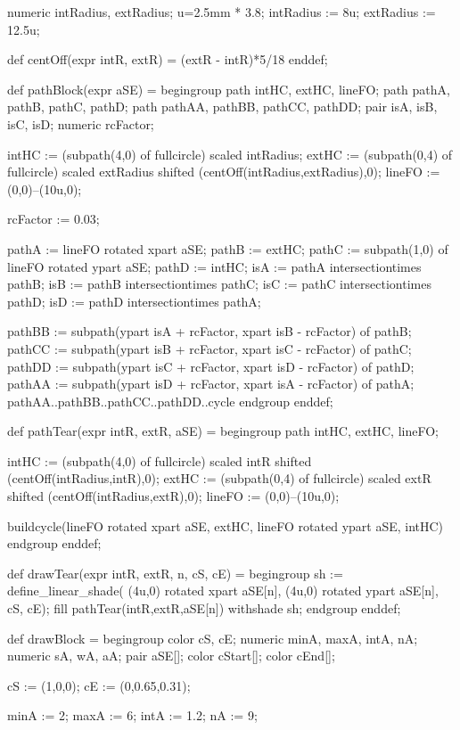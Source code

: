 numeric intRadius, extRadius;
u=2.5mm * 3.8;
intRadius := 8u;
extRadius := 12.5u;

def centOff(expr intR, extR) =
(extR - intR)*5/18
enddef;

def pathBlock(expr aSE) =
begingroup
path intHC, extHC, lineFO;
path pathA, pathB, pathC, pathD;
path pathAA, pathBB, pathCC, pathDD;
pair isA, isB, isC, isD;
numeric rcFactor; %

intHC := (subpath(4,0) of fullcircle) scaled intRadius;
extHC := (subpath(0,4) of fullcircle) scaled extRadius shifted (centOff(intRadius,extRadius),0);
lineFO := (0,0)--(10u,0);

rcFactor := 0.03;

pathA := lineFO rotated xpart aSE;
pathB := extHC;
pathC := subpath(1,0) of lineFO rotated ypart aSE;
pathD := intHC;
isA := pathA intersectiontimes pathB;
isB := pathB intersectiontimes pathC;
isC := pathC intersectiontimes pathD;
isD := pathD intersectiontimes pathA;

pathBB := subpath(ypart isA + rcFactor, xpart isB - rcFactor) of pathB;
pathCC := subpath(ypart isB + rcFactor, xpart isC - rcFactor) of pathC;
pathDD := subpath(ypart isC + rcFactor, xpart isD - rcFactor) of pathD;
pathAA := subpath(ypart isD + rcFactor, xpart isA - rcFactor) of pathA;
pathAA..pathBB..pathCC..pathDD..cycle
endgroup
enddef;

def pathTear(expr intR, extR, aSE) =
begingroup
path intHC, extHC, lineFO;

intHC := (subpath(4,0) of fullcircle) scaled intR shifted (centOff(intRadius,intR),0);
extHC := (subpath(0,4) of fullcircle) scaled extR shifted (centOff(intRadius,extR),0);
lineFO := (0,0)--(10u,0);

buildcycle(lineFO rotated xpart aSE, extHC, lineFO rotated ypart aSE, intHC)
endgroup
enddef;

def drawTear(expr intR, extR, n, cS, cE) =
begingroup
	sh := define_linear_shade(
			(4u,0) rotated xpart aSE[n],
			(4u,0) rotated ypart aSE[n],
			cS,
			cE);
	fill pathTear(intR,extR,aSE[n]) withshade sh;
endgroup
enddef;

def drawBlock =
begingroup
color cS, cE;
numeric minA, maxA, intA, nA;
numeric sA, wA, aA;
pair aSE[]; %
color cStart[]; %
color cEnd[];

cS := (1,0,0);
cE := (0,0.65,0.31);


minA := 2; %
maxA := 6; %
intA := 1.2; %
nA := 9; %

